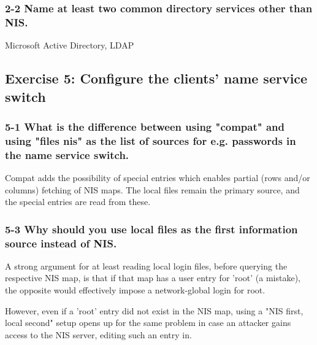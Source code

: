 \subsubsection{2-2 Name at least two common directory services other than NIS.}
Microsoft Active Directory, LDAP


\subsection{Exercise 5: Configure the clients' name service switch}
\subsubsection{5-1 What is the difference between using "compat" and using "files nis" as the list of sources for e.g. passwords in the name service switch.}
Compat adds the possibility of special entries which enables partial (rows and/or columns) fetching of NIS maps. The local files remain the primary source, and the special entries are read from these.


\subsubsection{5-3 Why should you use local files as the first information source instead of NIS.}
A strong argument for at least reading local login files, before querying the respective NIS map, is that if that map has a user entry for 'root' (a mistake), the opposite would effectively impose a network-global login for root.

However, even if a 'root' entry did not exist in the NIS map, using a "NIS first, local second" setup opens up for the same problem in case an attacker gains access to the NIS server, editing such an entry in.






